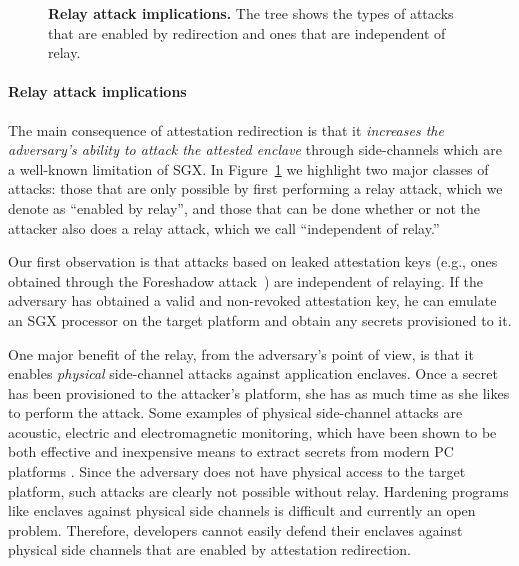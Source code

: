 \begin{figure}[t]
    
    \caption{\textbf{Relay attack implications.} The tree shows the types of attacks that are enabled by  redirection and ones that are independent of relay.}
    \label{fig:relayTree}
\end{figure}            

\paragraph{Relay attack implications}
The main consequence of attestation redirection is that it \emph{increases the adversary's ability to attack the attested enclave} through side-channels which are a well-known limitation of SGX. In Figure~\ref{fig:relayTree} we highlight two major classes of attacks: those that are only possible by first performing a relay attack, which we denote as ``enabled by relay'', and those that can be done whether or not the attacker also does a relay attack, which we call ``independent of relay.''

Our first observation is that attacks based on leaked attestation keys (e.g., ones obtained through the Foreshadow attack~\cite{foreshadow-usenix18}) are independent of relaying. If the adversary has obtained a valid and non-revoked attestation key, he can emulate an SGX processor on the target platform and obtain any secrets provisioned to it.

One major benefit of the relay, from the adversary's point of view, is that it enables \emph{physical} side-channel attacks against application enclaves. Once a secret has been provisioned to the attacker's platform, she has as much time as she likes to perform the attack. Some examples of physical side-channel attacks are acoustic, electric and electromagnetic monitoring, which have been shown to be both effective and inexpensive means to extract secrets from modern PC platforms . Since the adversary does not have physical access to the target platform, such attacks are clearly not possible without relay. Hardening programs like enclaves against physical side channels is difficult and currently an open problem. Therefore, developers cannot easily defend their enclaves against physical side channels that are enabled by attestation redirection.

